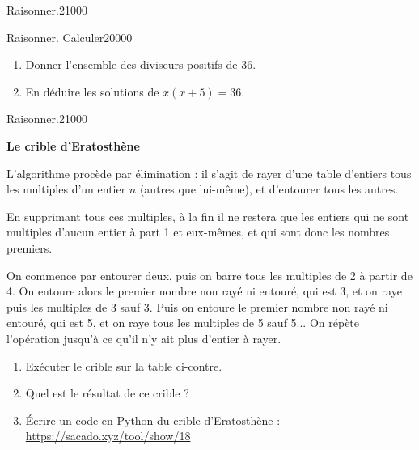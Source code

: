 \begin{pageParcourst}
\begin{ExoCtN}{Raisonner.}{2}{1}{0}{0}{0}
\end{ExoCtN}


\begin{ExoCtN}{Raisonner. Calculer}{2}{0}{0}{0}{0}
\begin{enumerate}
\item Donner l'ensemble des diviseurs positifs de 36.
\item En déduire les solutions de $x(x+5)=36$.
\end{enumerate}
\end{ExoCtN}




\begin{ExoCtN}{Raisonner.}{2}{1}{0}{0}{0}
 
 \begin{minipage}{0.5\linewidth} 
 
\textbf{Le crible d'Eratosthène}

L'algorithme procède par élimination : il s'agit de rayer d'une table d'entiers tous les multiples d'un entier $n$ (autres que lui-même), et d'entourer
tous les autres. 

En supprimant tous ces multiples, à la fin il ne restera que les entiers qui ne sont multiples d'aucun entier à part 1 et eux-mêmes, et qui sont donc les nombres premiers.

On commence par entourer deux, puis on barre tous
les multiples de 2 à partir de 4. On entoure alors le premier
nombre non rayé ni entouré, qui est 3, et on raye puis les multiples de 3
sauf 3. Puis on entoure le premier nombre non rayé ni entouré, qui est
5, et on raye tous les multiples de 5 sauf 5... On répète l'opération
jusqu'à ce qu'il n'y ait plus d'entier à rayer. 

\begin{enumerate}

\item Exécuter le crible sur la table ci-contre.
\item Quel est le résultat de ce crible ? 

\item Écrire un code en Python du crible d'Eratosthène : \url{https://sacado.xyz/tool/show/18}

\end{enumerate}

\end{minipage}
\begin{minipage}{0.5\linewidth}


\end{minipage}
\end{ExoCtN}
\end{pageParcourst}
